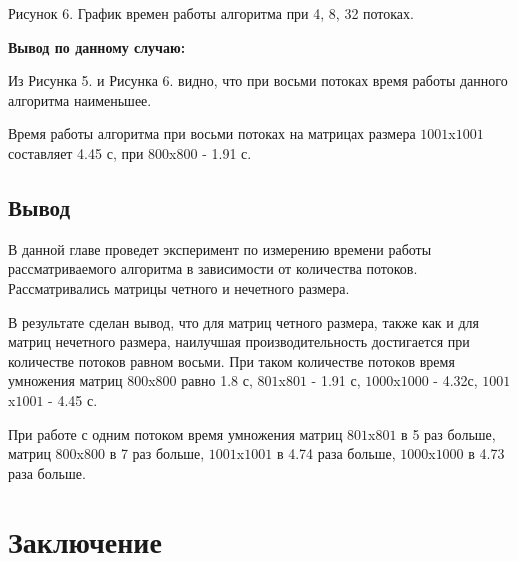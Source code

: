 \documentclass[12pt]{report}
\begin{document}
	\begin{center}
		
		Рисунок 6. График времен работы алгоритма при 4, 8, 32 потоках.
	\end{center}
	\newpage
	\textbf{Вывод по данному случаю:}
	
	Из Рисунка 5. и Рисунка 6. видно, что при восьми потоках время работы данного алгоритма наименьшее.
	
	Время работы алгоритма при восьми потоках на матрицах размера $1001$x$1001$ составляет 4.45 с, при $800$x$800$ - 1.91 с.
	
	\section*{Вывод}
	
	В данной главе проведет эксперимент по измерению времени работы рассматриваемого алгоритма в зависимости от количества потоков. Рассматривались матрицы четного и нечетного размера.
	
	В результате сделан вывод, что для матриц четного размера, также как и для матриц нечетного размера, наилучшая производительность достигается при количестве потоков равном восьми. При таком количестве потоков время умножения матриц $800$x$800$ равно 1.8 с, $801$x$801$ - 1.91 с, $1000$x$1000$ - 4.32с, $1001$x$1001$ - 4.45 с.
	
	При работе с одним потоком время умножения матриц $801$x$801$ в 5 раз больше, матриц $800$x$800$ в 7 раз больше, $1001$x$1001$ в 4.74 раза больше, $1000$x$1000$ в 4.73 раза больше.
	
	\chapter*{Заключение}
	
\end{document}
